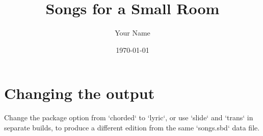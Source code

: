 \documentclass[11pt,a5paper]{article}
\title{Songs for a Small Room}
\author{Your Name}
\date{\today}
\begin{document}
\maketitle

\begin{songs}{}

\end{songs}

\section*{Changing the output}
Change the package option from `chorded` to `lyric`, or use `slide` and
`trans` in separate builds, to produce a different edition from the same
`songs.sbd` data file.
\end{document}
